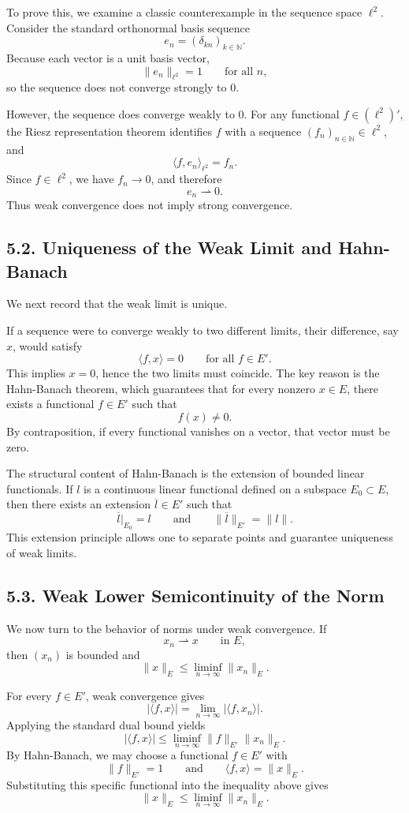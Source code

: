 \documentclass[11pt]{article}
\theoremstyle{definition}
\theoremstyle{remark}
\begin{document}
To prove this, we examine a classic counterexample in the sequence space \(\ell^2\). Consider the standard orthonormal basis sequence
\[
e_n=(\delta_{kn})_{k\in\mathbb N}.
\]
Because each vector is a unit basis vector,
\[
\|e_n\|_{\ell^2}=1
\qquad \text{for all } n,
\]
so the sequence does not converge strongly to \(0\).

However, the sequence does converge weakly to \(0\). For any functional \(f\in (\ell^2)'\), the Riesz representation theorem identifies \(f\) with a sequence \((f_n)_{n\in\mathbb N}\in\ell^2\), and
\[
\langle f,e_n\rangle_{\ell^2}=f_n.
\]
Since \(f\in\ell^2\), we have \(f_n\to 0\), and therefore
\[
e_n\rightharpoonup 0.
\]
Thus weak convergence does not imply strong convergence.

\subsection*{5.2. Uniqueness of the Weak Limit and Hahn-Banach}
We next record that the weak limit is unique.

If a sequence were to converge weakly to two different limits, their difference, say \(x\), would satisfy
\[
\langle f,x\rangle=0
\qquad \text{for all } f\in E'.
\]
This implies \(x=0\), hence the two limits must coincide. The key reason is the Hahn-Banach theorem, which guarantees that for every nonzero \(x\in E\), there exists a functional \(f\in E'\) such that
\[
f(x)\neq 0.
\]
By contraposition, if every functional vanishes on a vector, that vector must be zero.

The structural content of Hahn-Banach is the extension of bounded linear functionals. If \(l\) is a continuous linear functional defined on a subspace \(E_0\subset E\), then there exists an extension \(\overline l\in E'\) such that
\[
\overline l|_{E_0}=l
\qquad \text{and} \qquad
\|\overline l\|_{E'}=\|l\|.
\]
This extension principle allows one to separate points and guarantee uniqueness of weak limits.

\subsection*{5.3. Weak Lower Semicontinuity of the Norm}
We now turn to the behavior of norms under weak convergence. If
\[
x_n\rightharpoonup x
\qquad \text{in } E,
\]
then \((x_n)\) is bounded and
\[
\|x\|_E\le\liminf_{n\to\infty}\|x_n\|_E.
\]

For every \(f\in E'\), weak convergence gives
\[
|\langle f,x\rangle|
=
\lim_{n\to\infty}|\langle f,x_n\rangle|.
\]
Applying the standard dual bound yields
\[
|\langle f,x\rangle|
\le
\liminf_{n\to\infty}\|f\|_{E'}\|x_n\|_E.
\]
By Hahn-Banach, we may choose a functional \(f\in E'\) with
\[
\|f\|_{E'}=1
\qquad \text{and} \qquad
\langle f,x\rangle=\|x\|_E.
\]
Substituting this specific functional into the inequality above gives
\[
\|x\|_E\le\liminf_{n\to\infty}\|x_n\|_E.
\]
\end{document}
